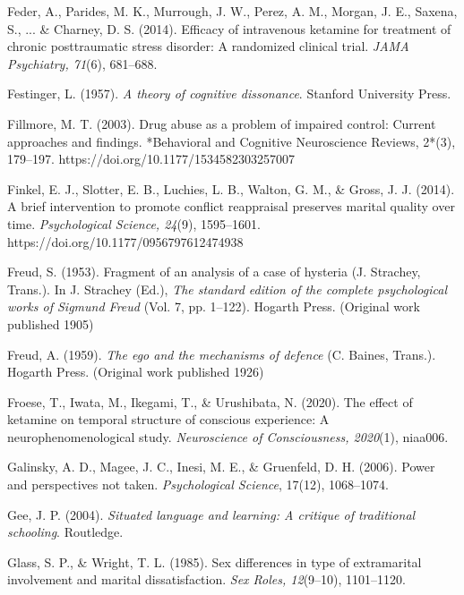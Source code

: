\begin{thebibliography}{}
    Feder, A., Parides, M. K., Murrough, J. W., Perez, A. M., Morgan, J. E., Saxena, S., ... \& Charney, D. S. (2014). Efficacy of intravenous ketamine for treatment of chronic posttraumatic stress disorder: A randomized clinical trial. \textit{JAMA Psychiatry, 71}(6), 681–688.
    
    Festinger, L. (1957). \textit{A theory of cognitive dissonance}. Stanford University Press.

    Fillmore, M. T. (2003). Drug abuse as a problem of impaired control: Current approaches and findings. *Behavioral and Cognitive Neuroscience Reviews, 2*(3), 179–197. https://doi.org/10.1177/1534582303257007

    Finkel, E. J., Slotter, E. B., Luchies, L. B., Walton, G. M., \& Gross, J. J. (2014). A brief intervention to promote conflict reappraisal preserves marital quality over time. \textit{Psychological Science, 24}(9), 1595–1601. https://doi.org/10.1177/0956797612474938

    Freud, S. (1953). Fragment of an analysis of a case of hysteria (J. Strachey, Trans.). In J. Strachey (Ed.), \textit{The standard edition of the complete psychological works of Sigmund Freud} (Vol. 7, pp. 1–122). Hogarth Press. (Original work published 1905)

    Freud, A. (1959). \textit{The ego and the mechanisms of defence} (C. Baines, Trans.). Hogarth Press. (Original work published 1926)

    Froese, T., Iwata, M., Ikegami, T., \& Urushibata, N. (2020). The effect of ketamine on temporal structure of conscious experience: A neurophenomenological study. \textit{Neuroscience of Consciousness, 2020}(1), niaa006.
    
    Galinsky, A. D., Magee, J. C., Inesi, M. E., \& Gruenfeld, D. H. (2006). Power and perspectives not taken. \textit{Psychological Science}, 17(12), 1068–1074.
    
    Gee, J. P. (2004). \textit{Situated language and learning: A critique of traditional schooling}. Routledge.
    
    Glass, S. P., \& Wright, T. L. (1985). Sex differences in type of extramarital involvement and marital dissatisfaction. \textit{Sex Roles, 12}(9–10), 1101–1120.
    

\end{thebibliography}

